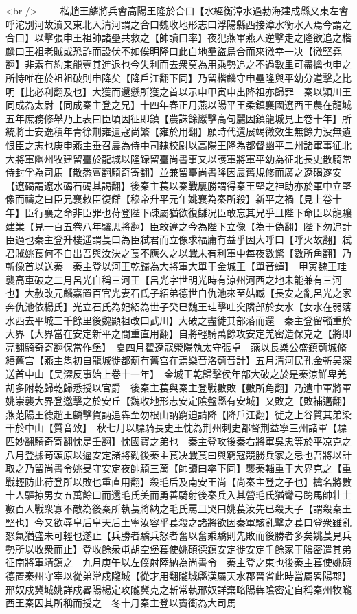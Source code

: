 <br />
　　楷趙王麟將兵會高陽王隆於合口【水經衡漳水過勃海建成縣又東左會呼沱别河故瀆又東北入清河謂之合口魏收地形志曰浮陽縣西接漳水衡水入焉今謂之合口】以擊張申王祖帥諸壘共救之【帥讀曰率】夜犯燕軍燕人逆擊走之隆欲追之楷麟曰王祖老賊或恐詐而設伏不如俟明隆曰此白地羣盜烏合而來徼幸一决【徼堅堯翻】非素有約束能壹其進退也今失利而去衆莫為用乘勢追之不過數里可盡擒也申之所恃唯在於祖祖破則申降矣【降戶江翻下同】乃留楷麟守申壘隆與平幼分道擊之比明【比必利翻及也】大獲而還懸所獲之首以示申甲寅申出降祖亦歸罪　秦以潁川王同成為太尉【同成秦主登之兄】十四年春正月燕以陽平王柔鎮襄國遼西王農在龍城五年庶務修舉乃上表曰臣頃因征即鎮【農誅餘巖擊高句麗因鎮龍城見上卷十年】所統將士安逸積年青徐荆雍遺寇尚繁【雍於用翻】願時代還展竭微效生無餘力没無遺恨臣之志也庚申燕主垂召農為侍中司隸校尉以高陽王隆為都督幽平二州諸軍事征北大將軍幽州牧建留臺於龍城以隆録留臺尚書事又以護軍將軍平幼為征北長史散騎常侍封孚為司馬【散悉亶翻騎奇寄翻】並兼留臺尚書隆因農舊規修而廣之遼碣遂安【遼碣謂遼水碣石碣其謁翻】後秦主萇以秦戰屢勝謂得秦王堅之神助亦於軍中立堅像而禱之曰臣兄襄敕臣復讎【穆帝升平元年姚襄為秦所殺】新平之禍【見上卷十年】臣行襄之命非臣罪也苻登陛下疎屬猶欲復讎况臣敢忘其兄乎且陛下命臣以龍驤建業【見一百五卷八年驤思將翻】臣敢違之今為陛下立像【為于偽翻】陛下勿追計臣過也秦主登升樓遥謂萇曰為臣弑君而立像求福庸有益乎因大呼曰【呼火故翻】弑君賊姚萇何不自出吾與汝決之萇不應久之以戰未有利軍中每夜數驚【數所角翻】乃斬像首以送秦　秦主登以河王乾歸為大將軍大單于金城王【單音蟬】　甲寅魏王珪襲高車破之二月呂光自稱三河王【呂光字世明光時有涼州河西之地未能兼有三河也】大赦改元麟嘉置百官光妻石氏子紹弟德世自仇池來至姑臧【長安之亂呂光之家奔仇池依楊氏】光立石氏為妃紹為世子癸巳魏王珪擊吐突隣部於女水【女水在弱落水西去平城三千餘里後魏顯祖改曰武川】大破之盡徙其部落而還　秦主登留輜重於大界【大界當在安定新平之間重直用翻】自將輕騎萬餘攻安定羌密造保克之【將即亮翻騎奇寄翻保當作堡】　夏四月翟遼寇滎陽執太守張卓　燕以長樂公盛鎮薊城脩繕舊宫【燕主雋初自龍城徙都薊有舊宫在焉樂音洛薊音計】五月清河民孔金斬吴深送首中山【吴深反事始上卷十一年】　金城王乾歸擊侯年部大破之於是秦涼鮮卑羌胡多附乾歸乾歸悉授以官爵　後秦主萇與秦主登戰數敗【數所角翻】乃遣中軍將軍姚崇襲大界登邀擊之於安丘【魏收地形志安定隂盤縣有安城】又敗之【敗補邁翻】　燕范陽王德趙王麟擊賀訥追犇至勿根山訥窮迫請降【降戶江翻】徙之上谷質其弟染干於中山【質音致】　秋七月以驃騎長史王忱為荆州刺史都督荆益寧三州諸軍【驃匹妙翻騎奇寄翻忱是壬翻】忱國寶之弟也　秦主登攻後秦右將軍吳忠等於平凉克之八月登據苟頭原以逼安定諸將勸後秦主萇决戰萇曰與窮寇競勝兵家之忌也吾將以計取之乃留尚書令姚旻守安定夜帥騎三萬【師讀曰率下同】襲秦輜重于大界克之【重戰輕防此苻登所以敗也重直用翻】殺毛后及南安王尚【尚秦主登之子也】擒名將數十人驅掠男女五萬餘口而還毛氏美而勇善騎射後秦兵入其營毛氏猶彎弓跨馬帥壮士數百人戰衆寡不敵為後秦所執萇將納之毛氏罵且哭曰姚萇汝先已殺天子【謂殺秦王堅也】今又欲辱皇后皇天后土寧汝容乎萇殺之諸將欲因秦軍駭亂擊之萇曰登衆雖亂怒氣猶盛未可輕也遂止【兵勝者驕兵怒者奮以奮乘驕則先敗而後勝者多矣姚萇見兵勢所以收衆而止】登收餘衆屯胡空堡萇使姚碩德鎮安定徙安定千餘家于隂密遣其弟征南將軍靖鎮之　九月庚午以左僕射陸納為尚書令　秦主登之東也後秦主萇使姚碩德置秦州守宰以從弟常戍隴城【從才用翻隴城縣漢屬天水郡晉省此時當屬畧陽郡】邢奴戍冀城姚詳戍畧陽楊定攻隴冀克之斬常執邢奴詳棄略陽犇隂密定自稱秦州牧隴西王秦因其所稱而授之　冬十月秦主登以竇衝為大司馬
